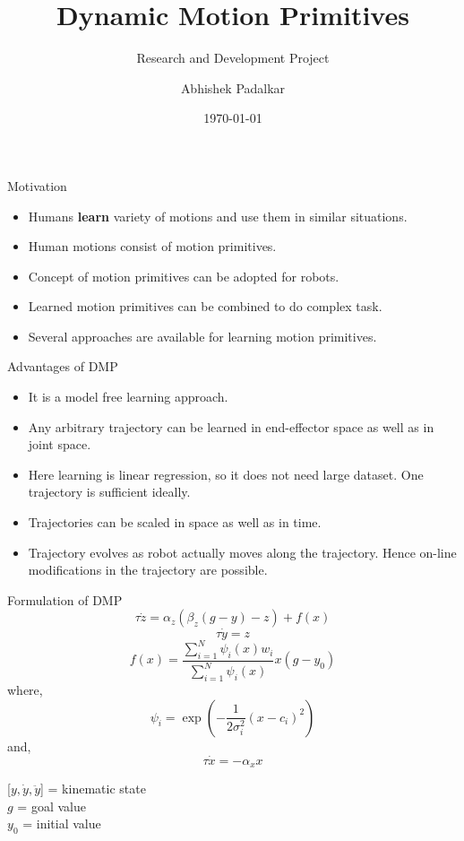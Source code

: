 \documentclass{beamer}
\author[]{Abhishek Padalkar}
\title{Dynamic Motion Primitives}
\subtitle{Research and Development Project}
\institute[HBRS]{Hochschule Bonn-Rhein-Sieg}
\date{\today}
\begin{document}
	{
	\begin{frame}
	\titlepage
	\end{frame}
	}
	
	\begin{frame}{Motivation}
		\begin{itemize}
			\item Humans \textbf{learn} variety of motions and use them in similar situations. 
			\item Human motions consist of motion primitives. 
			\item Concept of motion primitives can be adopted for robots. 
			\item Learned motion primitives can be combined to do complex task. 
			\item Several approaches are available for learning motion primitives.
		\end{itemize}
	\end{frame}
	
	
	\begin{frame}{Advantages of DMP}
		\begin{itemize}
			\item It is a model free learning approach.
			\item Any arbitrary trajectory can be learned in end-effector space as well as in joint space.
			\item Here learning is linear regression, so it does not need large dataset.
			One trajectory is sufficient ideally.
			\item Trajectories can be scaled in space as well as in time.
			\item Trajectory evolves as robot actually moves along the trajectory. Hence on-line modifications in the trajectory are possible.

		\end{itemize}
	\end{frame}

	\begin{frame}{Formulation of DMP}
		\begin{equation}\label{DMP_1}
		\tau\dot{z} = \alpha_{z}(\beta_{z}(g - y) - z) + f(x)
		\end{equation}
		\begin{equation}\label{DMP_2}
		\tau \dot{y} = z
		\end{equation}
		\begin{equation}\label{forcing_term}
		f(x) = \frac{\sum_{i=1}^{N}\psi_{i}(x)w_{i}}{\sum_{i=1}^{N}\psi_{i}(x)}x(g - y_{0})
		\end{equation}
		where,
		\begin{equation}\label{psi}
		\psi_{i} = \exp(-{\frac{1}{2\sigma_{i}^{2}}(x - c_{i})^{2}})
		\end{equation}
		and,
		\begin{equation}\label{canonical}
		\tau \dot{x} = -\alpha_{x}x
		\end{equation}
		
		[$y, \dot{y}, \ddot{y}$] = kinematic state  \\
		$g$ = goal value \\
		$y_{0}$ = initial value
	\end{frame}
	
\end{document}
